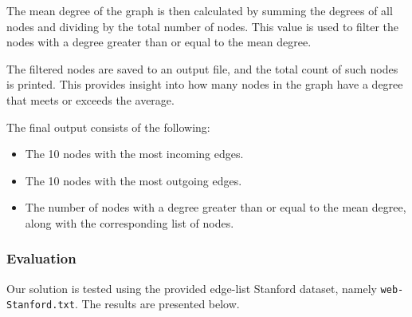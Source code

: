 \documentclass[acmlarge]{acmart}
\begin{document}
  The mean degree of the graph is then calculated by summing the degrees of all nodes and dividing by the total number of nodes. This value is used to filter the nodes with a degree greater than or equal to the mean degree.

  The filtered nodes are saved to an output file, and the total count of such nodes is printed. This provides insight into how many nodes in the graph have a degree that meets or exceeds the average.

  The final output consists of the following:
  \begin{itemize}
    \item The 10 nodes with the most incoming edges.
    \item The 10 nodes with the most outgoing edges.
    \item The number of nodes with a degree greater than or equal to the mean degree, along with the corresponding list of nodes.
  \end{itemize}

  \subsubsection{Evaluation} Our solution is tested using the provided edge-list Stanford dataset, namely \texttt{web-Stanford.txt}. The results are presented below.
\end{document}
